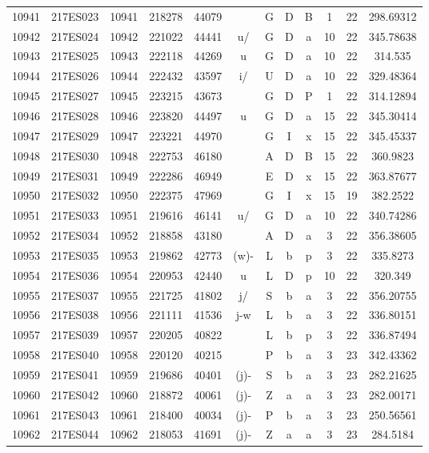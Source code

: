 \begin{tabular}{|*{12}{c|}}
10941 & 217ES023 & 10941 & 218278 & 44079 &  & G & D & B & 1 & 22 & 298.69312 \\ 
10942 & 217ES024 & 10942 & 221022 & 44441 & u/ & G & D & a & 10 & 22 & 345.78638 \\ 
10943 & 217ES025 & 10943 & 222118 & 44269 & u & G & D & a & 10 & 22 & 314.535 \\ 
10944 & 217ES026 & 10944 & 222432 & 43597 & i/ & U & D & a & 10 & 22 & 329.48364 \\ 
10945 & 217ES027 & 10945 & 223215 & 43673 &  & G & D & P & 1 & 22 & 314.12894 \\ 
10946 & 217ES028 & 10946 & 223820 & 44497 & u & G & D & a & 15 & 22 & 345.30414 \\ 
10947 & 217ES029 & 10947 & 223221 & 44970 &  & G & I & x & 15 & 22 & 345.45337 \\ 
10948 & 217ES030 & 10948 & 222753 & 46180 &  & A & D & B & 15 & 22 & 360.9823 \\ 
10949 & 217ES031 & 10949 & 222286 & 46949 &  & E & D & x & 15 & 22 & 363.87677 \\ 
10950 & 217ES032 & 10950 & 222375 & 47969 &  & G & I & x & 15 & 19 & 382.2522 \\ 
10951 & 217ES033 & 10951 & 219616 & 46141 & u/ & G & D & a & 10 & 22 & 340.74286 \\ 
10952 & 217ES034 & 10952 & 218858 & 43180 &  & A & D & a & 3 & 22 & 356.38605 \\ 
10953 & 217ES035 & 10953 & 219862 & 42773 & (w)- & L & b & p & 3 & 22 & 335.8273 \\ 
10954 & 217ES036 & 10954 & 220953 & 42440 & u & L & D & p & 10 & 22 & 320.349 \\ 
10955 & 217ES037 & 10955 & 221725 & 41802 & j/ & S & b & a & 3 & 22 & 356.20755 \\ 
10956 & 217ES038 & 10956 & 221111 & 41536 & j-w & L & b & a & 3 & 22 & 336.80151 \\ 
10957 & 217ES039 & 10957 & 220205 & 40822 &  & L & b & p & 3 & 22 & 336.87494 \\ 
10958 & 217ES040 & 10958 & 220120 & 40215 &  & P & b & a & 3 & 23 & 342.43362 \\ 
10959 & 217ES041 & 10959 & 219686 & 40401 & (j)- & S & b & a & 3 & 23 & 282.21625 \\ 
10960 & 217ES042 & 10960 & 218872 & 40061 & (j)- & Z & a & a & 3 & 23 & 282.00171 \\ 
10961 & 217ES043 & 10961 & 218400 & 40034 & (j)- & P & b & a & 3 & 23 & 250.56561 \\ 
10962 & 217ES044 & 10962 & 218053 & 41691 & (j)- & Z & a & a & 3 & 23 & 284.5184 \\ 

\end{tabular}
